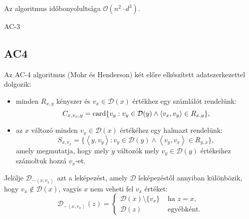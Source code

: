 Az algoritmus időbonyolultsága $\mathcal{O}(n^2 \cdot d^3)$.

\begin{algorithm}[H]
    \DontPrintSemicolon
    {
        \;
    }
    \caption{AC-3}
\end{algorithm}

\subsection{AC4}

Az AC-4 algoritmus (Mohr és Henderson) két előre elkészített
adatszerkezettel dolgozik:

\begin{itemize}
    \item minden $R_{x,y}$ kényszer és $v_x \in  \mathcal{D}(x)$ értékhez egy
         számlálót rendelünk: \[
             C_{x,v_x,y} =
             \operatorname{card} \{v_y : v_y \in \mathcal{D}(y) \land \langle v_x, v_y \rangle \in R_{x,y}\}
         ,\]
     \item az $x$ változó minden $v_x \in \mathcal{D}(x)$ értékéhez egy halmazt
         rendelünk: \[
            S_{x,v_x} = \{
                \left<y, v_y \right> :
                v_y \in \mathcal{D}(y) \land
                \left<v_y, v_x \right> \in R_{y,x}
            \}
        ,\]
        amely megmutatja, hogy mely $y$ változók mely $v_y \in \mathcal{D}(y)$ értékeihez
        számoltuk hozzá $v_x$-et.
\end{itemize}

Jelölje $\mathcal{D}_{-\left<x, v_x \right>}$ azt a leképezést, amely
$\mathcal{D}$ leképezéstől annyiban különbözik, hogy $v_x \not\in
\mathcal{D}(x)$, vagyis $x$ nem veheti fel $v_x$ értéket: \[
    \mathcal{D}_{-\left<x, v_x \right>}(z) =
    \begin{cases}
        \mathcal{D}(x)\setminus \{v_x\} & \text{ ha } z=x,\\
        \mathcal{D}(z) & \text{ egyébként.}
    \end{cases}
\]

